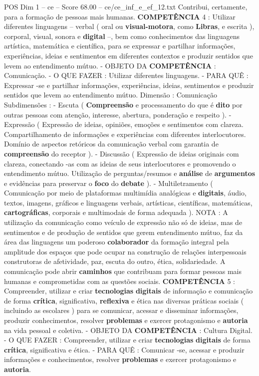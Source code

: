 \begin{textsample}{POS Dim 1 – ce – Score 68.00 – ce/ce\_inf\_e\_ef\_12.txt}
Contribui, certamente, para a formação de pessoas mais humanas. \textbf{COMPETÊNCIA} 4 : Utilizar diferentes linguagens – verbal ( oral ou \textbf{visual-motora}, como \textbf{Libras}, e escrita ), corporal, visual, sonora e \textbf{digital} –, bem como conhecimentos das linguagens artística, matemática e científica, para se expressar e partilhar informações, experiências, ideias e sentimentos em diferentes contextos e produzir sentidos que levem ao entendimento mútuo. - OBJETO DA \textbf{COMPETÊNCIA} : Comunicação. - O QUE FAZER : Utilizar diferentes linguagens. - PARA QUÊ : Expressar -se e partilhar informações, experiências, ideias, sentimentos e produzir sentidos que levem ao entendimento mútuo.
Dimensão : Comunicação Subdimensões : - Escuta ( \textbf{Compreensão} e processamento do que é \textbf{dito} por outras pessoas com atenção, interesse, abertura, ponderação e respeito ). - Expressão ( Expressão de ideias, opiniões, emoções e sentimentos com clareza.
Compartilhamento de informações e experiências com diferentes interlocutores.
Domínio de aspectos retóricos da comunicação verbal com garantia de \textbf{compreensão} do receptor ). - Discussão ( Expressão de ideias originais com clareza, conectando -as com as ideias de seus interlocutores e promovendo o entendimento mútuo.
Utilização de perguntas/resumos e \textbf{análise} de \textbf{argumentos} e evidências para preservar o \textbf{foco} do \textbf{debate} ). - Multiletramento ( Comunicação por meio de plataformas multimídia analógicas e \textbf{digitais}, áudio, textos, imagens, gráficos e linguagens verbais, artísticas, científicas, matemáticas, \textbf{cartográficas}, corporais e multimodais de forma adequada ).
NOTA : A utilização da comunicação como veículo de expressão não só de ideias, mas de sentimentos e de produção de sentidos que gerem entendimento mútuo, faz da área das linguagens um poderoso \textbf{colaborador} da formação integral pela amplitude dos espaços que pode ocupar na construção de relações interpessoais construtoras de afetividade, paz, escuta do outro, ética, solidariedade.
A comunicação pode abrir \textbf{caminhos} que contribuam para formar pessoas mais humanas e comprometidas com as questões sociais. \textbf{COMPETÊNCIA} 5 : Compreender, utilizar e criar \textbf{tecnologias} \textbf{digitais} de informação e comunicação de forma \textbf{crítica}, significativa, \textbf{reflexiva} e ética nas diversas práticas sociais ( incluindo as escolares ) para se comunicar, acessar e disseminar informações, produzir conhecimentos, resolver \textbf{problemas} e exercer protagonismo e \textbf{autoria} na vida pessoal e coletiva. - OBJETO DA \textbf{COMPETÊNCIA} : Cultura Digital. - O QUE FAZER : Compreender, utilizar e criar \textbf{tecnologias} \textbf{digitais} de forma \textbf{crítica}, significativa e ética. - PARA QUÊ : Comunicar -se, acessar e produzir informações e conhecimentos, resolver \textbf{problemas} e exercer protagonismo e \textbf{autoria}.

\end{textsample}
